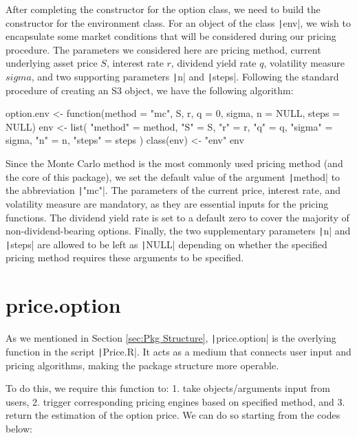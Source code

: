 After completing the constructor for the option class, we need to build the constructor for the environment class. For an object of the class \texttt|env|, we wish to encapsulate some market conditions that will be considered during our pricing procedure. The parameters we considered here are pricing method, current underlying asset price $S$, interest rate $r$, dividend yield rate $q$, volatility measure $sigma$, and two supporting parameters \texttt|n| and \texttt|steps|. Following the standard procedure of creating an S3 object, we have the following algorithm:

\begin{Rminted}
option.env <- function(method = "mc", S, r, q = 0, sigma, n = NULL, steps = NULL) {
    env <- list(
        "method" = method,
        "S" = S,
        "r" = r,
        "q" = q,
        "sigma" = sigma,
        "n" = n,
        "steps" = steps
    )
    class(env) <- "env"
    env
}
\end{Rminted}

Since the Monte Carlo method is the most commonly used pricing method (and the core of this package), we set the default value of the argument \texttt|method| to the abbreviation \texttt|"mc"|. The parameters of the current price, interest rate, and volatility measure are mandatory, as they are essential inputs for the pricing functions. The dividend yield rate is set to a default zero to cover the majority of non-dividend-bearing options. Finally, the two supplementary parameters \texttt|n| and \texttt|steps| are allowed to be left as \texttt|NULL| depending on whether the specified pricing method requires these arguments to be specified.

\section{price.option}

As we mentioned in Section \ref{sec:Pkg Structure}, \texttt|price.option| is the overlying function in the script \texttt|Price.R|. It acts as a medium that connects user input and pricing algorithms, making the package structure more operable.

To do this, we require this function to: 1. take objects/arguments input from users, 2. trigger corresponding pricing engines based on specified method, and 3. return the estimation of the option price. We can do so starting from the codes below:

